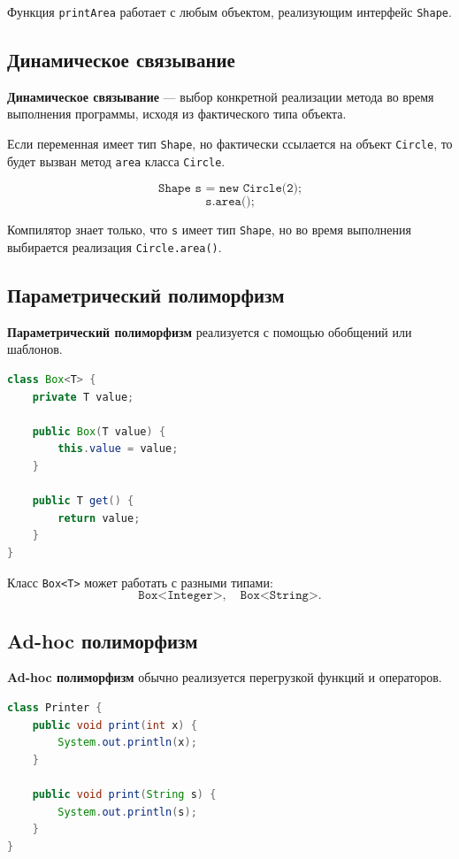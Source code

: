 \documentclass[12pt,a4paper]{article}
\begin{document}
Функция \texttt{printArea} работает с любым объектом, реализующим интерфейс \texttt{Shape}.

\subsection{Динамическое связывание}

\textbf{Динамическое связывание} --- выбор конкретной реализации метода во время выполнения программы, исходя из фактического типа объекта.

Если переменная имеет тип \texttt{Shape}, но фактически ссылается на объект \texttt{Circle}, то будет вызван метод \texttt{area} класса \texttt{Circle}.

\[
\texttt{Shape s = new Circle(2);}
\]
\[
\texttt{s.area();}
\]

Компилятор знает только, что \texttt{s} имеет тип \texttt{Shape}, но во время выполнения выбирается реализация \texttt{Circle.area()}.

\subsection{Параметрический полиморфизм}

\textbf{Параметрический полиморфизм} реализуется с помощью обобщений или шаблонов.

\begin{lstlisting}[language=Java,caption={Параметрический полиморфизм}]
class Box<T> {
    private T value;

    public Box(T value) {
        this.value = value;
    }

    public T get() {
        return value;
    }
}
\end{lstlisting}

Класс \texttt{Box<T>} может работать с разными типами:
\[
\texttt{Box<Integer>}, \quad \texttt{Box<String>}.
\]

\subsection{Ad-hoc полиморфизм}

\textbf{Ad-hoc полиморфизм} обычно реализуется перегрузкой функций и операторов.

\begin{lstlisting}[language=Java,caption={Перегрузка методов}]
class Printer {
    public void print(int x) {
        System.out.println(x);
    }

    public void print(String s) {
        System.out.println(s);
    }
}
\end{lstlisting}
\end{document}
